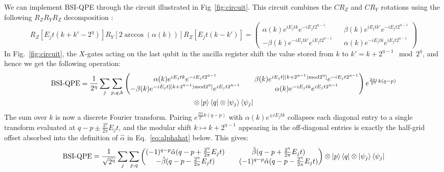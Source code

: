 \documentclass[aps,floatfix,10pt,amssymb,amsfont,amsmath,superscriptaddress,float,nofootinbib,longbibliography,nobalancelastpage,twocolumn]{revtex4-2}
\begin{document}
\begin{widetext}
We can implement BSI-QPE through the circuit illustrated in Fig~\ref{fig:circuit}. This circuit combines the  $CR_Z$ and $CR_Y$ rotations using the following $R_ZR_YR_Z$ decomposition \cite{Nielsen_Chuang_2010}: 
\begin{equation}
\label{eq:euler}
    R_Z[E_jt(k+k'-2^{\eta})]R_Y[2\arccos(\alpha(k))]R_Z[E_jt(k-k')] = \begin{pmatrix}
        \alpha(k)e^{iE_jtk}e^{-iE_jt2^{\eta-1}} && \beta(k)e^{iE_jt k'}e^{-iE_jt2^{\eta-1}}\\
        -\beta (k)e^{-iE_jt k'}e^{iE_jt2^{\eta-1}} && \alpha(k)e^{-iE_jtk}e^{iE_jt2^{\eta-1}}
    \end{pmatrix}
\end{equation}
In Fig.~\ref{fig:circuit}, the $X$-gates acting on the last qubit in the ancilla register shift the value stored from $k$ to $k'= k+2^{\eta-1} \mod 2^{\eta}$, and hence we get the following operation:
\begin{multline}
        \text{BSI-QPE} = \frac{1}{2^{\eta}}\sum_j\sum_{p,q,k} \begin{pmatrix}
        \alpha(k)e^{iE_jtk}e^{-iE_jt2^{\eta-1}} && \beta(k)e^{iE_jt[(k+2^{\eta-1})\text{mod} 2^{\eta}]}e^{-iE_jt2^{\eta-1}}\\
        -\beta (k)e^{-iE_jt[(k+2^{\eta-1})\text{mod} 2^{\eta}]}e^{iE_jt2^{\eta-1}} && \alpha(k)e^{-iE_jtk}e^{iE_jt2^{\eta-1}}
    \end{pmatrix}e^{\frac{2\pi i}{2^{\eta}}k(q-p)} \\\otimes\ket{p}\bra{q}\otimes\ket{\psi_j}\bra{\psi_j}
\end{multline}
The sum over $k$ is now a discrete Fourier transform. Pairing $e^{\frac{2\pi i}{2^{\eta}}k(q-p)}$ with $\alpha(k)e^{\pm iE_jtk}$ collapses each diagonal entry to a single transform evaluated at $q-p\pm\frac{2^{\eta}}{2\pi}E_jt$, and the modular shift $k \mapsto k+2^{\eta-1}$ appearing in the off-diagonal entries is exactly the half-grid offset absorbed into the definition of $\hat\alpha$ in Eq.~\eqref{eq:alphahat} below. This gives:
\begin{equation}
    \text{BSI-QPE} = \frac{1}{\sqrt{2^{\eta}}}\sum_j\sum_{p,q} \begin{pmatrix}
        (-1)^{q-p}\hat\alpha(q-p+\frac{2^{\eta}}{2\pi}E_jt) && \hat\beta(q-p+\frac{2^{\eta}}{2\pi}E_jt)\\
        -\hat\beta (q-p-\frac{2^{\eta}}{2\pi}E_jt) && (-1)^{q-p}\hat\alpha(q-p-\frac{2^{\eta}}{2\pi}E_jt)
    \end{pmatrix}\otimes\ket{p}\bra{q}\otimes\ket{\psi_j}\bra{\psi_j}

\end{equation}
\end{widetext}
\end{document}
